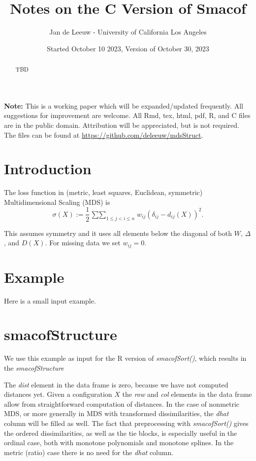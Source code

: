 \documentclass[
  12pt,
]{article}
\title{Notes on the C Version of Smacof}
\author{Jan de Leeuw - University of California Los Angeles}
\date{Started October 10 2023, Version of October 30, 2023}
\newcommand{\jis}{\mathop{\sum\sum}_{1\leq j<i\leq n}}
\begin{document}
\maketitle
\begin{abstract}
TBD
\end{abstract}

{
\setcounter{tocdepth}{4}
\tableofcontents
}
\textbf{Note:} This is a working paper which will be expanded/updated frequently. All suggestions for improvement are welcome. All Rmd, tex, html, pdf, R, and C files are in the public domain. Attribution
will be appreciated, but is not required. The files can be found at
\url{https://github.com/deleeuw/mdsStruct}.

\section{Introduction}\label{introduction}

The loss function in (metric, least squares, Euclidean, symmetric) Multidimensional Scaling (MDS)
is
\[
\sigma(X):=\frac12\jis w_{ij}(\delta_{ij}-d_{ij}(X))^2.
\]

This assumes symmetry and it uses all elements below the diagonal of both \(W\), \(\Delta\), and \(D(X)\).
For missing data we set \(w_{ij}=0\).

\section{Example}\label{example}

Here is a small input example.

\section{smacofStructure}\label{smacofstructure}

We use this example as input for the R version of \emph{smacofSort()}, which results in the
\emph{smacofStructure}

The \emph{dist} element in the data frame is zero, because we have not computed distances yet.
Given a configuration \(X\) the \emph{row} and \emph{col} elements in the data frame allow from
straightforward computation of distances. In the case of nonmetric MDS, or more generally
in MDS with transformed dissimilarities, the \emph{dhat} column will be filled as well.
The fact that preprocessing with \emph{smacofSort()} gives the ordered dissimilarities, as
well as the tie blocks, is especially useful in the ordinal case, both with monotone
polynomials and monotone splines. In the metric (ratio) case there is no need for the
\emph{dhat} column.
\end{document}
